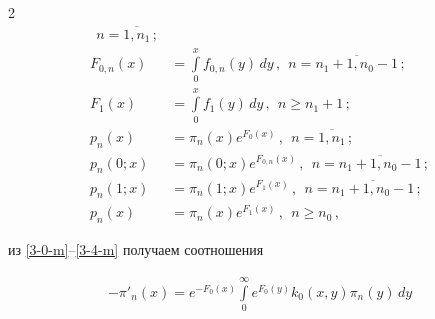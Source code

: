 \begin{multicols}{2}
\begin{align*}
\ \ n=\overline{1,n_1}\,;


\\




F_{0,n}(x) &= \int\limits_0^x f_{0,n}(y)\, dy\,,


\ \ n=\overline{n_1+1,n_0-1}\,;


\\




F_{1}(x)&= \int\limits_0^x f_{1}(y)\, dy\,,


\ \ n\ge n_1+1\,;


\\




p_n(x) &= \pi_n(x) e^{F_0(x)} \,, \ \ n=\overline{1,n_1}\,;


\\




p_n(0;x) &= \pi_n(0;x) e^{F_{0,n}(x)} \,, \ \ n=\overline{n_1+1,n_0-1}\,;


\\




p_n(1;x) &= \pi_n(1;x) e^{F_{1}(x)} \,, \ \ n=\overline{n_1+1,n_0-1}\,;


\\


p_n(x) &= \pi_n(x) e^{F_{1}(x)} \,, \ \ n\ge n_0\,,


\end{align*}













\noindent


из \eqref{3-0-m}--\eqref{3-4-m} получаем соотношения





\noindent




\begin{multline}


\label{pi-1-m}


-\pi'_n(x) = e^{-F_0(x)} \int\limits_0^\infty e^{F_0(y)} k_0(x,y) \pi_n(y)\, dy



\end{multline}
\end{multicols}

